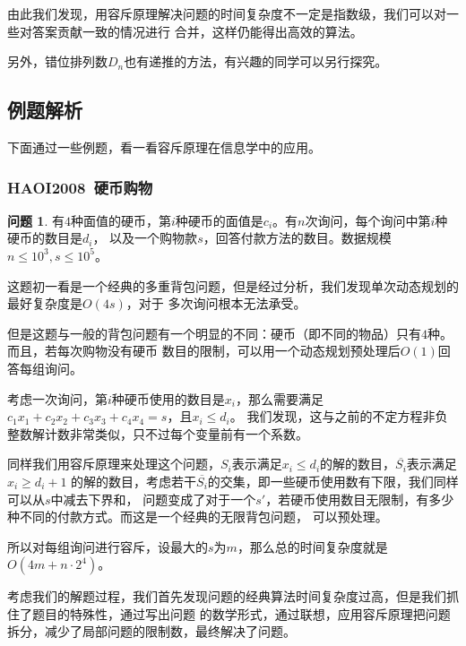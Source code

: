 \documentclass{noithesis}
\theoremstyle{plain}      \newtheorem{theorem}{定理}[subsection]
\theoremstyle{definition} \newtheorem{problem}{问题}[subsection]
\begin{document}
由此我们发现，用容斥原理解决问题的时间复杂度不一定是指数级，我们可以对一些对答案贡献一致的情况进行
合并，这样仍能得出高效的算法。 \par

另外，错位排列数$D_n$也有递推的方法，有兴趣的同学可以另行探究。

\subsection{例题解析}

下面通过一些例题，看一看容斥原理在信息学中的应用。

\subsubsection{HAOI2008~硬币购物}

\begin{problem}
有$4$种面值的硬币，第$i$种硬币的面值是$c_i$。有$n$次询问，每个询问中第$i$种硬币的数目是$d_i$，
以及一个购物款$s$，回答付款方法的数目。数据规模$n \le 10^3,s \le 10^5$。
\end{problem}
\par

这题初一看是一个经典的多重背包问题，但是经过分析，我们发现单次动态规划的最好复杂度是$O(4s)$，对于
多次询问根本无法承受。 \par

但是这题与一般的背包问题有一个明显的不同：硬币（即不同的物品）只有$4$种。而且，若每次购物没有硬币
数目的限制，可以用一个动态规划预处理后$O(1)$回答每组询问。 \par

考虑一次询问，第$i$种硬币使用的数目是$x_i$，那么需要满足$c_1x_1+c_2x_2+c_3x_3+c_4x_4=s$，且$x_i \le d_i$。
我们发现，这与之前的不定方程非负整数解计数非常类似，只不过每个变量前有一个系数。 \par

同样我们用容斥原理来处理这个问题，$S_i$表示满足$x_i \le d_i$的解的数目，$\overline{S_i}$表示满足$x_i \ge d_i + 1$
的解的数目，考虑若干$\overline{S_i}$的交集，即一些硬币使用数有下限，我们同样可以从$s$中减去下界和，
问题变成了对于一个$s'$，若硬币使用数目无限制，有多少种不同的付款方式。而这是一个经典的无限背包问题，
可以预处理。 \par

所以对每组询问进行容斥，设最大的$s$为$m$，那么总的时间复杂度就是$O(4m + n \cdot 2^4)$。 \par

考虑我们的解题过程，我们首先发现问题的经典算法时间复杂度过高，但是我们抓住了题目的特殊性，通过写出问题
的数学形式，通过联想，应用容斥原理把问题拆分，减少了局部问题的限制数，最终解决了问题。
\end{document}

